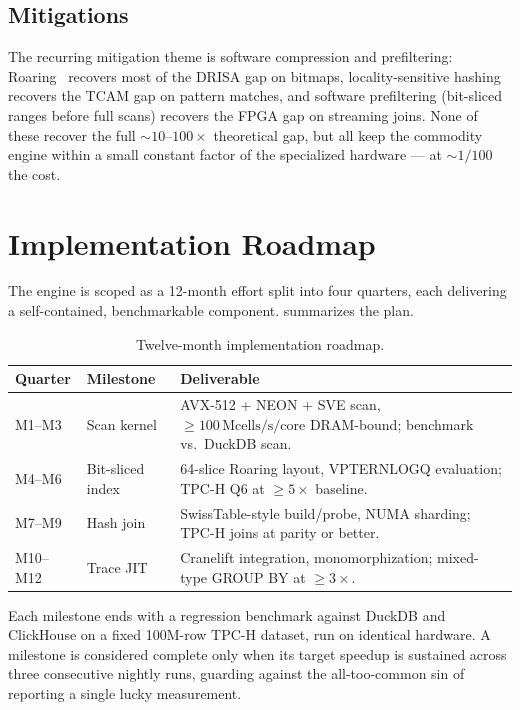 \documentclass[10pt]{article}
\theoremstyle{definition}
\begin{document}
\subsection{Mitigations}

The recurring mitigation theme is software compression and prefiltering: Roaring~\citep{roaring_impl} recovers most of the DRISA gap on bitmaps, locality-sensitive hashing~\citep{andoni_indyk} recovers the TCAM gap on pattern matches, and software prefiltering (bit-sliced ranges before full scans) recovers the FPGA gap on streaming joins. None of these recover the full $\sim\!10$--$100\times$ theoretical gap, but all keep the commodity engine within a small constant factor of the specialized hardware --- at $\sim\!1/100$ the cost.

\section{Implementation Roadmap}

The engine is scoped as a 12-month effort split into four quarters, each delivering a self-contained, benchmarkable component.  summarizes the plan.

\begin{table}[t]
\centering
\caption{Twelve-month implementation roadmap.}
\label{tab:roadmap}
\small
\begin{tabular}{llp{7.5cm}}
\toprule
Quarter & Milestone & Deliverable \\
\midrule
M1--M3  & Scan kernel & AVX-512 + NEON + SVE scan, $\geq\!100\,\text{Mcells/s/core}$ DRAM-bound; benchmark vs.\ DuckDB scan. \\
M4--M6  & Bit-sliced index & 64-slice Roaring layout, VPTERNLOGQ evaluation; TPC-H Q6 at $\geq\!5\times$ baseline. \\
M7--M9  & Hash join & SwissTable-style build/probe, NUMA sharding; TPC-H joins at parity or better. \\
M10--M12 & Trace JIT & Cranelift integration, monomorphization; mixed-type GROUP BY at $\geq\!3\times$. \\
\bottomrule
\end{tabular}
\end{table}

Each milestone ends with a regression benchmark against DuckDB and ClickHouse on a fixed 100M-row TPC-H dataset, run on identical hardware. A milestone is considered complete only when its target speedup is sustained across three consecutive nightly runs, guarding against the all-too-common sin of reporting a single lucky measurement.
\end{document}

